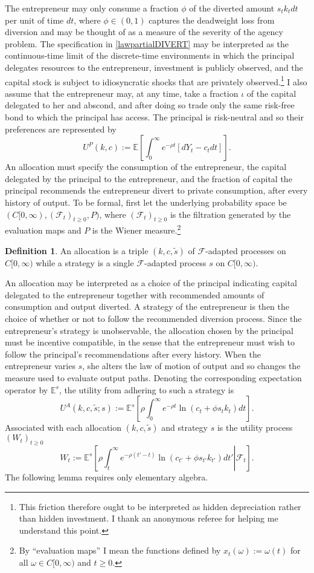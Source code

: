 \documentclass[11pt]{article}
\theoremstyle{plain}
\theoremstyle{definition} %
\newtheorem{defn}{Definition}[section]
\begin{document}
The entrepreneur may only consume a fraction $\phi$ of the diverted amount $s_tk_tdt$ per unit of time $dt$, where $\phi \in (0,1)$ captures the deadweight loss from diversion and may be thought of as a measure of the severity of the agency problem. The specification in \eqref{lawpartialDIVERT} may be interpreted as the continuous-time limit of the discrete-time environments in which the principal delegates resources to the entrepreneur, investment is publicly observed, and the capital stock is subject to idiosyncratic shocks that are privately observed.\footnote{This friction therefore ought to be interpreted as hidden depreciation rather than hidden investment. I thank an anonymous referee for helping me understand this point.} I also assume that the entrepreneur may, at any time, take a fraction $\iota$ of the capital delegated to her and abscond, and after doing so trade only the same risk-free bond to which the principal has access. The principal is risk-neutral and so their preferences are represented by 
$$
U^P(k,c) := \mathbb{E}{\left[\int_0^{\infty} e^{-\rho t}[dY_t - c_tdt]\right]}.
$$ 
An allocation must specify the consumption of the entrepreneur, the capital delegated by the principal to the entrepreneur, and the fraction of capital the principal recommends the entrepreneur divert to private consumption, after every history of output. To be formal, first let the underlying probability space be $(C[0,\infty), (\mathcal{F}_t)_{t\geq0}, P)$, where $(\mathcal{F}_t)_{t\geq0}$ is the filtration generated by the evaluation maps and $P$ is the Wiener measure.\footnote{By ``evaluation maps'' I mean the functions defined by $x_t(\omega) := \omega(t)$ for all $\omega \in C[0,\infty)$ and $t \geq0$.} 

\begin{defn}\label{defnALLOC}
An allocation is a triple $(k, c, \tilde{s})$ of $\mathcal{F}$-adapted processes on $C[0,\infty)$ while a strategy is a single $\mathcal{F}$-adapted process $s$ on $C[0,\infty)$. 
\end{defn}

An allocation may be interpreted as a choice of the principal indicating capital delegated to the entrepreneur together with recommended amounts of consumption and output diverted. A strategy of the entrepreneur is then the choice of whether or not to follow the recommended diversion process. Since the entrepreneur's strategy is unobservable, the allocation chosen by the principal must be incentive compatible, in the sense that the entrepreneur must wish to follow the principal's recommendations after every history. When the entrepreneur varies $s$, she alters the law of motion of output and so changes the measure used to evaluate output paths. Denoting the corresponding expectation operator by $\mathbb{E}^s$, the utility from adhering to such a strategy is 
$$
U^A(k, c, \tilde{s}; s) := \mathbb{E}^s{\left[\rho\int_{0}^{\infty} e^{-\rho t}\ln (c_t + \phi s_t k_t)dt \right]}. 
$$
Associated with each allocation $(k,c,\tilde{s})$ and strategy $s$ is the utility process $(W_t)_{t\geq0}$ 
$$
W_t := \mathbb{E}^s{\left[\rho \left. \int_{t}^{\infty} e^{-\rho (t'-t)}  \ln (c_{t'} + \phi s_{t'} k_{t'})dt' \right| \mathcal{F}_t\right]} .
$$
The following lemma requires only elementary algebra. %
\end{document}
